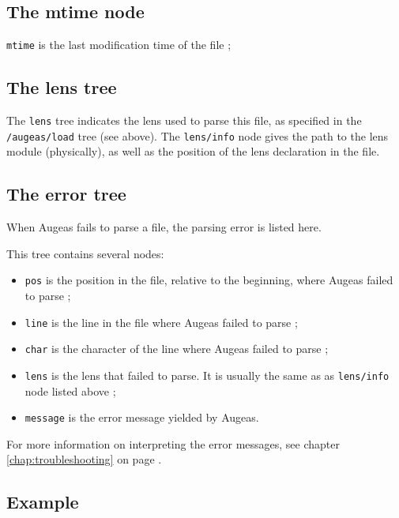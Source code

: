 \subsection{The mtime node}

\verb!mtime! is the last modification time of the file ;

\subsection{The lens tree}

The \verb!lens! tree indicates the lens used to parse this file, as specified in the \verb!/augeas/load! tree (see above). The \verb!lens/info! node gives the path to the lens module (physically), as well as the position of the lens declaration in the file.

\subsection{The error tree}

When Augeas fails to parse a file, the parsing error is listed here.

This tree contains several nodes:

\begin{itemize}
\item
  \verb!pos! is the position in the file, relative to the beginning, where Augeas failed to parse ;
\item
  \verb!line! is the line in the file where Augeas failed to parse ;
\item
  \verb!char! is the character of the line where Augeas failed to parse ;
\item
  \verb!lens! is the lens that failed to parse. It is usually the same as as \verb!lens/info! node listed above ;
\item
  \verb!message! is the error message yielded by Augeas.
\end{itemize}
For more information on interpreting the error messages, see chapter \ref{chap:troubleshooting} on page \pageref{chap:troubleshooting}.

\subsection{Example}

